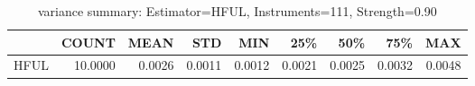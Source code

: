 \begin{table}[ht]
\centering
\caption{variance summary: Estimator=HFUL, Instruments=111, Strength=0.90}
\begin{tabular}{lrrrrrrrr}
\toprule
 & COUNT & MEAN & STD & MIN & 25\% & 50\% & 75\% & MAX \\
\midrule
HFUL & 10.0000 & 0.0026 & 0.0011 & 0.0012 & 0.0021 & 0.0025 & 0.0032 & 0.0048 \\
\bottomrule
\end{tabular}
\end{table}
